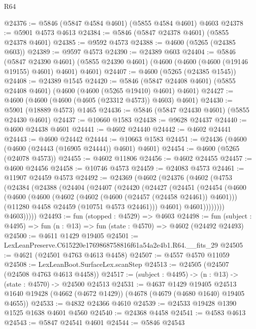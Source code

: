 \begin{lexlean}{R64}
\begin{coremodule}
@24376 := @5846 (@5847 @4584 @4601) (@5855 @4584 @4601) @4603
@24378 := @5901 @4573 @4613
@24384 := @5846 (@5847 @24378 @4601) (@5855 @24378 @4601)
@24385 := @9592 @4573
@24388 := @4600 (@5265 (@24385 @603))
@24389 := @9597 @4573
@24390 := @24389 @603
@24404 := @5846
    (@5847 @24390 @4601)
    (@5855 @24390 @4601)
    (@4600 (@4600 (@4600 (@19146 @19155) @4601) @4601) @4601)
@24407 := @4600 (@5265 (@24385 @1545))
@24408 := @24389 @1545
@24420 := @5846 (@5847 @24408 @4601) (@5855 @24408 @4601) (@4600 (@4600 (@5265 @19410) @4601) @4601)
@24427 := @4600 (@4600 (@4600 (@4605 (@23312 @4573)) @4603) @4601)
@24430 := @5901 (@18889 @4573) @1465
@24436 := @5846 (@5847 @24430 @4601) (@5855 @24430 @4601)
@24437 := @10660 @1583
@24438 := @9628 @24437
@24440 := @4600 @24438 @4601
@24441 := @4602 @24440
@24442 := @4602 @24441
@24443 := @4600 @24442
@24444 := @10663 @1583
@24451 := @24436 (@4600 (@4600 (@24443 (@16905 @24444)) @4601) @4601)
@24454 := @4600 (@5265 (@24078 @4573))
@24455 := @4602 @11806
@24456 := @4602 @24455
@24457 := @4600 @24456
@24458 := @10746 @4573
@24459 := @24083 @4573
@24461 := @11907 @24459 @4573
@24492 := @24369
    (@4602
      (@24376
        (@4602
          (@4753
            (@24384
              (@24388
                (@24404
                  (@24407
                    (@24420
                      (@24427
                        (@24451
                          (@24454
                            (@4600
                              (@4600
                                (@4600
                                  (@4602 (@4602 (@4600 (@24457 (@24458 @24461)) @4601)))
                                  (@11280 @4458 @24459 (@10751 @4573 @24461)))
                                @4601)
                              @4601))))))))
              @4603)))))
@24493 := fun (stopped : @4529) => @4603
@24498 := fun (subject : @4495) => fun (n : @13) => fun (state : @4570) => @4602 (@24492 @24493)
@24500 := @4611 @1429 @19405
@24501 := LexLeanPreserve.C615220e1769868758816f61a54a2e4b1.R64.__fits_29
@24505 := @4621 (@24501 @4763 @4613 @4458)
@24507 := @4557 @4570 @11059
@24508 := LexLeanBoot.SurfaceLex.scanStep
@24513 := @24505 (@24507 (@24508 @4763 @4613 @4458))
@24517 := (subject : @4495) -> (n : @13) -> (state : @4570) -> @24500 @24513
@24531 := @4637
    @1429
    @19405
    @24513
    @1640
    @19428
    (@4662 (@4672 @1429))
    (@4678 (@4679 (@4680 @1640) @19405 @4655))
@24533 := @4832 @24366 @4610
@24539 := @24533 @19428 @1390 @1525 @1638 @4601 @4560
@24540 := @24368 @4458
@24541 := @4583 @4613
@24543 := @5847 @24541 @4601
@24544 := @5846 @24543

\end{coremodule}
\end{lexlean}

